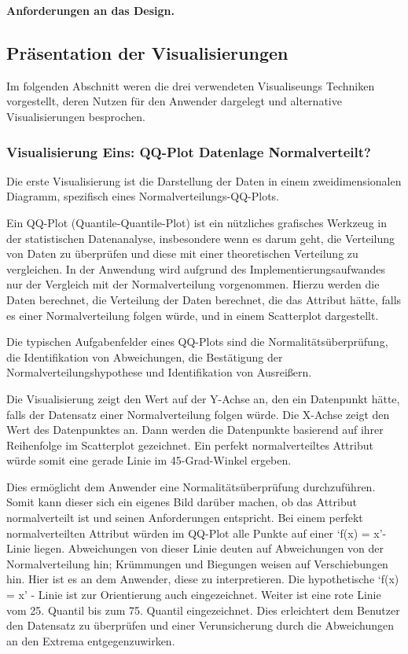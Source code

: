 \documentclass[usegeometry=true]{scrartcl}
\begin{document}
\textbf{ Anforderungen an das Design. }
\subsection{Präsentation der Visualisierungen}

Im folgenden Abschnitt weren die drei verwendeten Visualiseungs Techniken vorgestellt, deren Nutzen für den Anwender dargelegt und alternative Visualisierungen besprochen.

\subsubsection{Visualisierung Eins: QQ-Plot Datenlage Normalverteilt?}

Die erste Visualisierung ist die Darstellung der Daten in einem zweidimensionalen Diagramm, spezifisch eines Normalverteilungs-QQ-Plots.

Ein QQ-Plot (Quantile-Quantile-Plot) ist ein nützliches grafisches Werkzeug in der statistischen Datenanalyse, insbesondere wenn es darum geht, die Verteilung von Daten zu überprüfen und diese mit einer theoretischen Verteilung zu vergleichen. In der Anwendung wird aufgrund des Implementierungsaufwandes nur der Vergleich mit der Normalverteilung vorgenommen. Hierzu werden die Daten berechnet, die Verteilung der Daten berechnet, die das Attribut hätte, falls es einer Normalverteilung folgen würde, und in einem Scatterplot dargestellt.

Die typischen Aufgabenfelder eines QQ-Plots sind die Normalitätsüberprüfung, die Identifikation von Abweichungen, die Bestätigung der Normalverteilungshypothese und Identifikation von Ausreißern.

Die Visualisierung zeigt den Wert auf der Y-Achse an, den ein Datenpunkt hätte, falls der Datensatz einer Normalverteilung folgen würde. Die X-Achse zeigt den Wert des Datenpunktes an. Dann werden die Datenpunkte basierend auf ihrer Reihenfolge im Scatterplot gezeichnet. Ein perfekt normalverteiltes Attribut würde somit eine gerade Linie im 45-Grad-Winkel ergeben.

Dies ermöglicht dem Anwender eine Normalitätsüberprüfung durchzuführen. Somit kann dieser sich ein eigenes Bild darüber machen, ob das Attribut normalverteilt ist und seinen Anforderungen entspricht. Bei einem perfekt normalverteilten Attribut würden im QQ-Plot alle Punkte auf einer `f(x) = x'-Linie liegen. Abweichungen von dieser Linie deuten auf Abweichungen von der Normalverteilung hin; Krümmungen und Biegungen weisen auf Verschiebungen hin. Hier ist es an dem Anwender, diese zu interpretieren. Die hypothetische `f(x) = x' - Linie ist zur Orientierung auch eingezeichnet. Weiter ist eine rote Linie vom 25. Quantil bis zum 75. Quantil eingezeichnet. Dies erleichtert dem Benutzer den Datensatz zu überprüfen und einer Verunsicherung durch die Abweichungen an den Extrema entgegenzuwirken.
\end{document}
